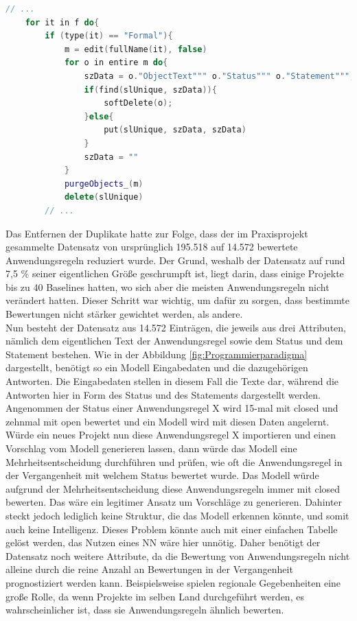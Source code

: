 \begin{lstlisting}[language = C++, caption={Duplikate in Modulen löschen},captionpos=b, label = lst:deleteDuplicates, float, floatplacement=H]
    // ...
    for it in f do{
        if (type(it) == "Formal"){
            m = edit(fullName(it), false)
            for o in entire m do{
                szData = o."ObjectText""" o."Status""" o."Statement""";
                if(find(slUnique, szData)){
                    softDelete(o);
                }else{
                    put(slUnique, szData, szData)
                }
                szData = "" 
            }
            purgeObjects_(m)
            delete(slUnique)
        // ...
\end{lstlisting}

Das Entfernen der Duplikate hatte zur Folge, dass der im Praxisprojekt gesammelte Datensatz von ursprünglich 195.518 auf 14.572 bewertete Anwendungsregeln reduziert wurde.
Der Grund, weshalb der Datensatz auf rund 7,5 \% seiner eigentlichen Größe geschrumpft ist, liegt darin, dass einige Projekte bis zu 40 Baselines hatten, 
wo sich aber die meisten Anwendungsregeln nicht verändert hatten. Dieser Schritt war wichtig, um dafür zu sorgen, dass bestimmte Bewertungen nicht stärker gewichtet werden,
als andere. \\

Nun besteht der Datensatz aus 14.572 Einträgen, die jeweils aus drei Attributen, nämlich dem eigentlichen Text der Anwendungsregel sowie dem Status und dem Statement bestehen.
Wie in der Abbildung \ref{fig:Programmierparadigma} dargestellt, benötigt so ein Modell Eingabedaten und die dazugehörigen Antworten. Die Eingabedaten stellen in diesem Fall
die Texte dar, während die Antworten hier in Form des Status und des Statements dargestellt werden. Angenommen der Status einer Anwendungsregel X wird 15-mal mit closed
und zehnmal mit open bewertet und ein Modell wird mit diesen Daten angelernt. Würde ein neues Projekt nun diese Anwendungsregel X importieren und einen Vorschlag vom Modell
generieren lassen, dann würde das Modell eine Mehrheitsentscheidung durchführen und prüfen, wie oft die Anwendungsregel in der Vergangenheit mit welchem Status bewertet wurde.
Das Modell würde aufgrund der Mehrheitsentscheidung diese Anwendungsregeln immer mit closed bewerten. Das wäre ein legitimer Ansatz um Vorschläge zu generieren. 
Dahinter steckt jedoch lediglich keine Struktur, die das Modell erkennen könnte, und somit auch keine Intelligenz. Dieses Problem könnte auch mit einer einfachen Tabelle 
gelöst werden, das Nutzen eines \ac{NN} wäre hier unnötig. Daher benötigt der Datensatz noch weitere Attribute, da die Bewertung von Anwendungsregeln nicht alleine durch die 
reine Anzahl an Bewertungen in der Vergangenheit prognostiziert werden kann. Beispielsweise spielen regionale Gegebenheiten eine große Rolle, 
da wenn Projekte im selben Land durchgeführt werden, es wahrscheinlicher ist, dass sie Anwendungsregeln ähnlich bewerten. 

